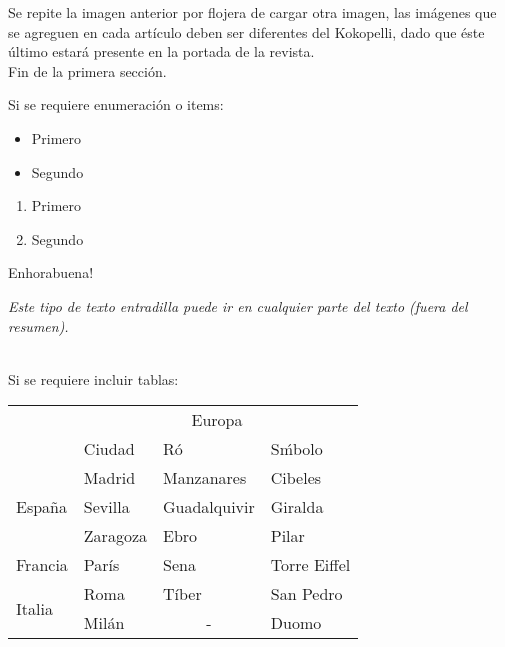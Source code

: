 \begin{multicols}{2}
Se repite la imagen anterior por flojera de cargar otra imagen, las im\'agenes que se agreguen en cada art\'iculo deben ser diferentes del Kokopelli, dado que \'este \'ultimo estar\'a presente en la portada de la revista. \\ 

Fin de la primera secci\'on.



Si se requiere enumeraci\'on o items:
\begin{itemize}
    \item Primero
    \item Segundo
\end{itemize}

\begin{enumerate}
    \item Primero
    \item Segundo
\end{enumerate}

Enhorabuena! 


\begin{entradilla}
{\em Este tipo de texto entradilla {\color{introcolor}{ (as\'i se define en el c\'odigo) }} 
  puede ir en cualquier parte del texto (fuera del resumen).}
\end{entradilla}

\\
Si se requiere incluir tablas:
\medskip


\begin{tabular}{|l|l|l|l|}
    \hline
    & \multicolumn{3}{c|}{Europa} \\
    \cline{2-4}
    & Ciudad & R\'o & S\'mbolo\\
    \hline \hline
    \multirow{3}{1cm}{Espa\~na} & Madrid & Manzanares & Cibeles\\ \cline{2-4}
    & Sevilla & Guadalquivir & Giralda\\ \cline{2-4}
    & Zaragoza & Ebro & Pilar\\ \cline{1-4}
    Francia & Par\'is & Sena & Torre Eiffel\\ \cline{1-4}
    \multirow{2}{1cm}{Italia} & Roma & T\'iber & San Pedro\\ \cline{2-4}
    & Mil\'an & \multicolumn{1}{c|}{-} & Duomo\\ \cline{1-4}
\end{tabular}

\medskip


\end{multicols}
